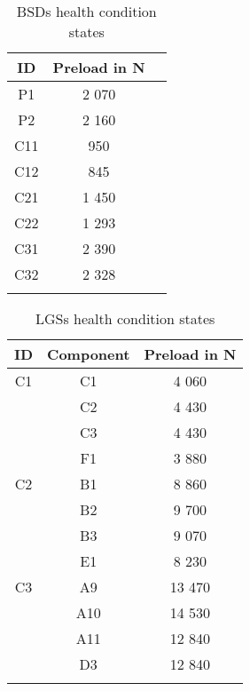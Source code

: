 \begin{center}
\begin{longtable}{c c c} 
\toprule
 ID & Preload in N \\ [0.5ex] 
\midrule
 P1 & 2 070 \\ 
 P2 & 2 160 \\ 
 C11 & 950 \\ 
 C12 & 845 \\ 
 C21 & 1 450 \\ [1ex] 
 C22 & 1 293 \\ [1ex] 
 C31 & 2 390 \\ [1ex] 
 C32 & 2 328 \\ [1ex] 
\bottomrule
\caption {BSDs health condition states}
\label {tab:BSDs_states}
\end{longtable}
\end{center}

\begin{center}
\begin{longtable}{c c c} 
\toprule
 ID & Component & Preload in N \\ [0.5ex] 
\midrule
 C1 & C1 & 4 060 \\ 
    & C2 & 4 430 \\ 
    & C3 & 4 430 \\
    & F1 & 3 880 \\ 
\midrule
 C2 & B1 & 8 860 \\ 
    & B2 & 9 700 \\ [1ex] 
    & B3 & 9 070 \\ [1ex]
    & E1 & 8 230 \\ [1ex]
\midrule
 C3 & A9 & 13 470 \\ 
    & A10 & 14 530 \\ [1ex] 
    & A11 & 12 840 \\ [1ex]
    & D3 & 12 840 \\ [1ex]
\bottomrule
\caption {LGSs health condition states}
\label {tab:LGSs_states}
\end{longtable}
\end{center}

\begin{comment}
\begin{center}
\begin{longtable}{c c c c c c c c c c} 
\toprule
&&&&BSD&&&&
\cmidrule(lr){3-11}
  & & C31 & C21 & C11 & P1 & C22 & C12 & C32 & P2  \\ [0.5ex] 
\cmidrule(lr){3-11}
                          & C1 & 1 & 2 & 3 & 4 & 5 & 6 & 7 & 9 \\ 
LGS                       & C2 & 10 & 11 & 12 & 13 & 14 & 15 & 16 & 18  \\ 
                          & C3 & 19 & 20 & 21 & 22 & 23 & 24 & 25 & 27  \\
\bottomrule
\caption {Combinations of LGS and BSD health condition states}
\label {tab:recorded_combinations_of_LGS_and_BSD_health_conditions}
\end{longtable}
\end{center}
\end{comment}






